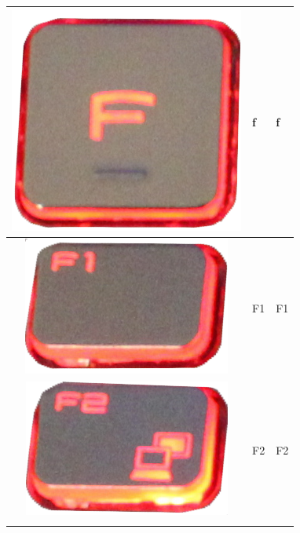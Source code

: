 \begin{longtable}{|cll|}
\begin{minipage}[c]{.3\textwidth}
\includegraphics[scale=0.06]{Images/KeyMapping/f}
\vspace{0.2cm}
\end{minipage} & f & f\\
\hline
\begin{minipage}[c]{.3\textwidth}
\vspace{0.2cm}
\includegraphics[scale=0.06]{Images/KeyMapping/F1}
\vspace{0.2cm}
\end{minipage} & F1 & F1\\
\hline
\begin{minipage}[c]{.3\textwidth}
\vspace{0.2cm}
\includegraphics[scale=0.06]{Images/KeyMapping/F2}
\vspace{0.2cm}
\end{minipage} & F2 & F2\\
\hline
\begin{minipage}[c]{.3\textwidth}

\end{minipage}
\end{longtable}
